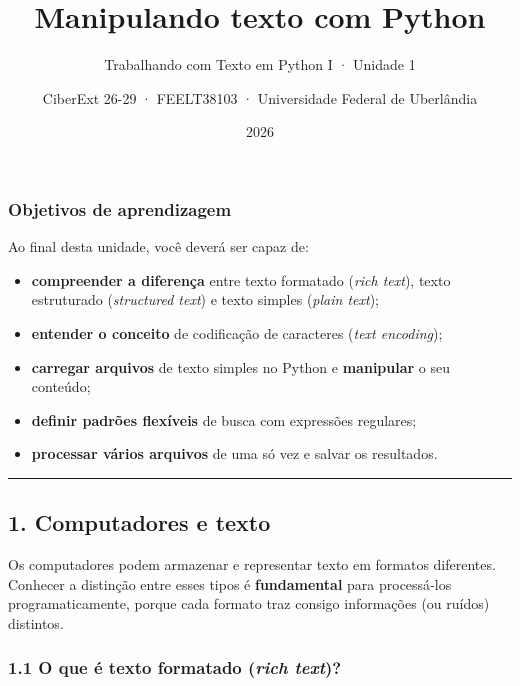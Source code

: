 \documentclass[
  brazilian,
  11pt,
]{article}
\title{Manipulando texto com Python}
\subtitle{Trabalhando com Texto em Python I · Unidade 1}
\author{CiberExt 26-29 · FEELT38103 · Universidade Federal de
Uberlândia}
\date{2026}
\providecommand{\tightlist}{%
  \setlength{\itemsep}{0pt}\setlength{\parskip}{0pt}}
\begin{document}
\maketitle

{
\setcounter{tocdepth}{2}
\tableofcontents
}
\subsubsection{Objetivos de
aprendizagem}\label{objetivos-de-aprendizagem}

Ao final desta unidade, você deverá ser capaz de:

\begin{itemize}
\tightlist
\item
  \textbf{compreender a diferença} entre texto formatado (\emph{rich
  text}), texto estruturado (\emph{structured text}) e texto simples
  (\emph{plain text});
\item
  \textbf{entender o conceito} de codificação de caracteres (\emph{text
  encoding});
\item
  \textbf{carregar arquivos} de texto simples no Python e
  \textbf{manipular} o seu conteúdo;
\item
  \textbf{definir padrões flexíveis} de busca com expressões regulares;
\item
  \textbf{processar vários arquivos} de uma só vez e salvar os
  resultados.
\end{itemize}

\begin{center}\rule{0.5\linewidth}{0.5pt}\end{center}

\subsection{1. Computadores e texto}\label{computadores-e-texto}

Os computadores podem armazenar e representar texto em formatos
diferentes. Conhecer a distinção entre esses tipos é
\textbf{fundamental} para processá‑los programaticamente, porque cada
formato traz consigo informações (ou ruídos) distintos.

\subsubsection{\texorpdfstring{1.1 O que é texto formatado (\emph{rich
text})?}{1.1 O que é texto formatado (rich text)?}}\label{o-que-uxe9-texto-formatado-rich-text}
\end{document}
